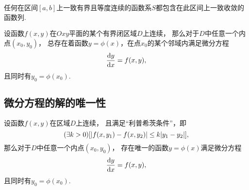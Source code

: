 \begin{lemma}\label{theorem:微分方程概论.阿斯科拉--阿尔泽拉引理}
任何在区间\([a,b]\)上一致有界且等度连续的函数系\(S\)都包含在此区间上一致收敛的函数列.
\end{lemma}

\begin{theorem}
设函数\(f(x,y)\)在\(Oxy\)平面的某个有界闭区域\(D\)上连续，
那么对于\(D\)中任意一个内点\((x_0,y_0)\)，
总存在着函数\(y = \phi(x)\)，在点\(x_0\)的某个邻域内满足微分方程\[
\dv{y}{x} = f(x,y),
\]且同时有\(y_0 = \phi(x_0)\).
\end{theorem}

\subsection{微分方程的解的唯一性}
\begin{theorem}
设函数\(f(x,y)\)在区域\(D\)上连续，
且满足“利普希茨条件”，即\[
	(\exists k>0)
	[
		\abs{f(x,y_1) - f(x,y_2)}
		\leq
		k \abs{y_1 - y_2}
	],
\]
那么对于\(D\)中任意一个内点\((x_0,y_0)\)，
存在唯一的函数\(y=\phi(x)\)满足微分方程\[
	\dv{y}{x} = f(x,y),
\]
且同时有\(y_0 = \phi(x_0)\).
\end{theorem}
